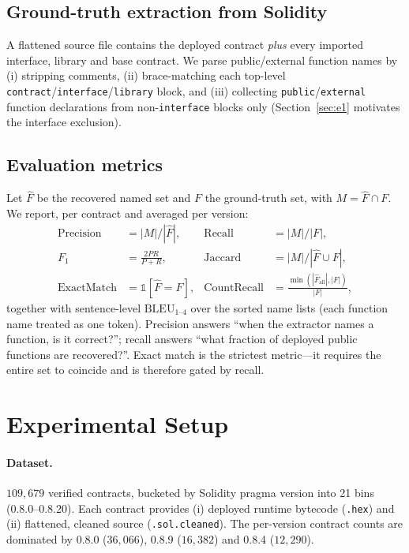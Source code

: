 \documentclass[10pt,conference]{article}
\begin{document}
\subsection{Ground-truth extraction from Solidity}
A flattened source file contains the deployed contract \emph{plus} every imported
interface, library and base contract. We parse public/external function names by
(i) stripping comments, (ii) brace-matching each top-level
\texttt{contract}/\texttt{interface}/\texttt{library} block, and (iii) collecting
\texttt{public}/\texttt{external} function declarations from non-\texttt{interface}
blocks only (Section~\ref{sec:e1} motivates the interface exclusion).

\subsection{Evaluation metrics}
Let $\widehat{F}$ be the recovered named set and $F$ the ground-truth set, with
$M=\widehat{F}\cap F$. We report, per contract and averaged per version:
\begin{align}
\text{Precision} &= |M|/|\widehat{F}|, &
\text{Recall} &= |M|/|F|, \\
F_1 &= \tfrac{2PR}{P+R}, &
\text{Jaccard} &= |M|/|\widehat{F}\cup F|, \\
\text{ExactMatch} &= \mathbb{1}[\widehat{F}=F], &
\text{CountRecall} &= \tfrac{\min(|\widehat{F}_{\text{all}}|,|F|)}{|F|},
\end{align}
together with sentence-level $\text{BLEU}_{1\text{--}4}$ over the sorted name
lists (each function name treated as one token). Precision answers ``when the
extractor names a function, is it correct?''; recall answers ``what fraction of
deployed public functions are recovered?''. Exact match is the strictest
metric---it requires the entire set to coincide and is therefore gated by recall.

\section{Experimental Setup}

\paragraph{Dataset.}
$109{,}679$ verified contracts, bucketed by Solidity pragma version into 21 bins
(0.8.0--0.8.20). Each contract provides (i) deployed runtime bytecode
(\texttt{.hex}) and (ii) flattened, cleaned source (\texttt{.sol.cleaned}). The
per-version contract counts are dominated by 0.8.0 ($36{,}066$), 0.8.9
($16{,}382$) and 0.8.4 ($12{,}290$).
\end{document}

